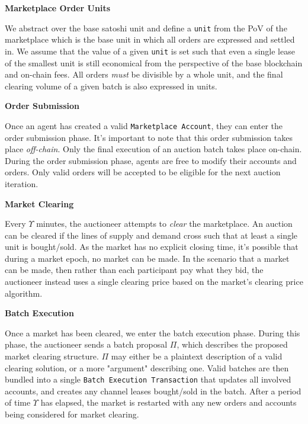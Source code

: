 \documentclass[10pt,a4paper]{article}
\theoremstyle{definition}
\begin{document}
\begin{center}
    \textbf{Marketplace Order Units}
\end{center}

We abstract over the base satoshi unit and define a \texttt{unit} from the PoV
of the marketplace which is the base unit in which all orders are expressed and
settled in. We assume that the value of a given \texttt{unit} is set such that
even a single lease of the smallest unit is still economical from the
perspective of the base blockchain and on-chain fees. All orders \emph{must} be
divisible by a whole unit, and the final clearing volume of a given batch is
also expressed in units.

\begin{center}
    \textbf{Order Submission}
\end{center}

Once an agent has created a valid \texttt{Marketplace Account}, they can enter
the order submission phase. It's important to note that this order submission
takes place \emph{off-chain}. Only the final execution of an auction batch
takes place on-chain. During the order submission phase, agents are free to
modify their accounts and orders. Only valid orders will be accepted to be
eligible for the next auction iteration.

\begin{center}
    \textbf{Market Clearing}
\end{center}

Every $\Upsilon$ minutes, the auctioneer attempts to \emph{clear} the marketplace.
An auction can be cleared if the lines of supply and demand cross such that at
least a single unit is bought/sold. As the market has no explicit closing time,
it's possible that during a market epoch, no market can be made. In the
scenario that a market can be made, then rather than each participant pay what
they bid, the auctioneer instead uses a single clearing price based on the
market's clearing price algorithm.

\begin{center}
    \textbf{Batch Execution}
\end{center}

Once a market has been cleared, we enter the batch execution phase. During this
phase, the auctioneer sends a batch proposal $\Pi$, which describes the
proposed market clearing structure. $\Pi$ may either be a plaintext description
of a valid clearing solution, or a more "argument" describing one.  Valid
batches are then bundled into a single \texttt{Batch Execution
Transaction} that updates all involved accounts, and creates any channel leases
bought/sold in the batch. After a period of time $\Upsilon$ has elapsed, the
market is restarted with any new orders and accounts being considered for
market clearing.
\end{document}
